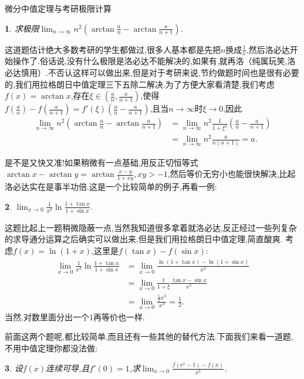 \documentclass[UTF8,no-math,12pt,openany,table,dvipsnames,svgnames]{book}
\newcommand{\hei}{\CJKfamily{hei}}
\newenvironment{solve}{\par\indent{\hei 解}\hspace{1em}}{\par}
\newtheorem{example}{}
\begin{document}
\begin{MYBOX}[colbacktitle=green]{微分中值定理与考研极限计算}
\begin{example}
求极限$\lim_{n\to\infty}n^2\left(\arctan\frac an-\arctan\frac a{n+1}\right)$.
\end{example}
\begin{solve}
这道题估计绝大多数考研的学生都做过,很多人基本都是先把$n$换成$\frac1x$,然后洛必达开始操作了.俗话说,没有什么极限是洛必达不能解决的,如果有,就再洛（纯属玩笑,洛必达慎用）.不否认这样可以做出来,但是对于考研来说,节约做题时间也是很有必要的,我们用拉格朗日中值定理三下五除二解决.为了方便大家看清楚,我们考虑$f(x)=\arctan x$,存在$\xi\in\left(\frac an,\frac a{n+1}\right)$,使得$f\left(\frac an\right)-f\left(\frac a{n+1}\right)=f'(\xi)\left(\frac an-\frac a{n+1}\right)$,且当$n\to\infty$时$\xi\to0$,因此
\begin{align*}
\lim_{n\to\infty}n^2\left(\arctan\frac an-\arctan\frac a{n+1}\right)&=\lim_{n\to\infty}n^2\frac1{1+\xi^2}\left(\frac an-\frac a{n+1}\right)\\
&=\lim_{n\to\infty}n^2\frac a{n(n+1)}=a.
\end{align*}
\end{solve}
是不是又快又准!如果稍微有一点基础,用反正切恒等式$\arctan x-\arctan y=\arctan\frac{x-y}{1+xy},xy>-1$,然后等价无穷小也能很快解决,比起洛必达实在是事半功倍.这是一个比较简单的例子,再看一例:
\begin{example}
$\lim_{x\to0}\frac 1{x^3}\ln\frac{1+\tan x}{1+\sin x}$.
\end{example}
\begin{solve}
这题比起上一题稍微隐蔽一点,当然我知道很多拿着就洛必达,反正经过一些列复杂的求导通分运算之后确实可以做出来,但是我们用拉格朗日中值定理,简直酸爽. 考虑$f(x)=\ln(1+x)$,这里是$f(\tan x)-f(\sin x)$:
\begin{align*}
\lim_{x\to0}\frac 1{x^3}\ln\frac{1+\tan x}{1+\sin x}&=\lim_{x\to0}\frac{\ln(1+\tan x)-\ln(1+\sin x)}{x^3}\\
&=\lim_{x\to0}\frac1{1+\xi}\frac{\tan x-\sin x}{x^3}\\
&=\lim_{x\to0}\frac{\frac12x^3}{x^3}=\frac12.
\end{align*}
当然,对数里面分出一个$1$再等价也一样.
\end{solve}
前面这两个题呢,都比较简单,而且还有一些其他的替代方法.下面我们来看一道题,不用中值定理你都没法做:
\begin{example}
设$f(x)$连续可导,且$f'(0)=1$,求$\lim_{x\to0}\frac{f(\mathrm e^x-1)-f(x)}{x^2}$.
\end{example}
\begin{solve}

\end{solve}
\end{MYBOX}
\end{document}
